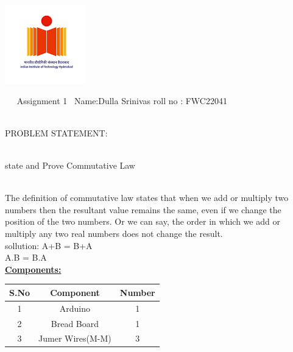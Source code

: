 \documentclass[letterpaper, 10 pt, conference]{ieeeconf}
\begin{document}
\raggedright \begin{center} \includegraphics[scale=0.09]{iit_h.png} \end{center}

\vspace{10mm}
\raggedright\textbf\ \hspace{1mm} \  Assignment 1\hspace{6cm}
 \  Name:\hspace{1mm}Dulla Srinivas\hspace{5cm} \hspace{4cm} 
roll no :\hspace{1mm} FWC22041\vspace{2cm}
\raggedright \\PROBLEM STATEMENT:\vspace{2mm}
\raggedright \\ state and Prove Commutative Law
\raggedright \\The definition of commutative law states that when we add or multiply two numbers then the resultant value remains the same, even if we change the position of the two numbers. Or we can say, the order in which we add or multiply any two real numbers does not change the result.
\vspace{1cm}
\\ sollution: A+B = B+A
 \\ \hspace{15mm} A.B = B.A
\vspace{5mm}
\\\textbf{\underline{Components:}}\vspace{2mm}
\begin{table}[ht]
\centering %
\begin{tabular}{c c c} %
\hline\hline %
S.No & Component & Number \\ [0.5ex] %
\hline
1 & Arduino & 1 \\
2 & Bread Board & 1 \\
3 & Jumer Wires(M-M) & 3\\
\hline
\end{tabular}
\end{table}
\end{document}
